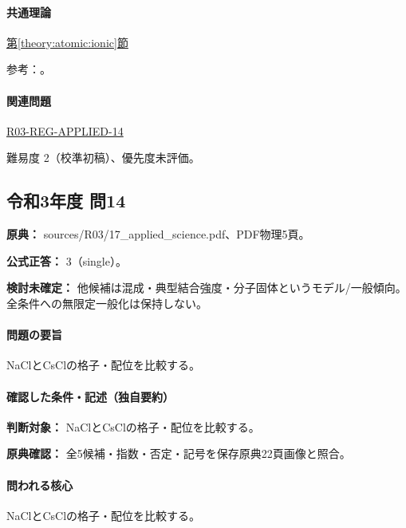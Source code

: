 \paragraph{共通理論} \hyperref[theory:atomic:ionic]{第\ref*{theory:atomic:ionic}節}

\par 参考：\cite{openstax_crystals}。

\paragraph{関連問題} \hyperref[q:r03-reg-applied-14]{R03-REG-APPLIED-14}

\par 難易度 2（校準初稿）、優先度未評価。

\subsection{令和3年度 問14}
\label{q:r03-reg-applied-14}

\noindent\textbf{原典：} sources/R03/17\_applied\_science.pdf、PDF物理5頁。

\textbf{公式正答：} 3（single）。

\par\textbf{検討未確定：} 他候補は混成・典型結合強度・分子固体というモデル/一般傾向。全条件への無限定一般化は保持しない。

\paragraph{問題の要旨} NaClとCsClの格子・配位を比較する。

\paragraph{確認した条件・記述（独自要約）}\mbox{}\par

\noindent\textbf{判断対象：} NaClとCsClの格子・配位を比較する。\par

\noindent\textbf{原典確認：} 全5候補・指数・否定・記号を保存原典22頁画像と照合。\par

\paragraph{問われる核心} NaClとCsClの格子・配位を比較する。

